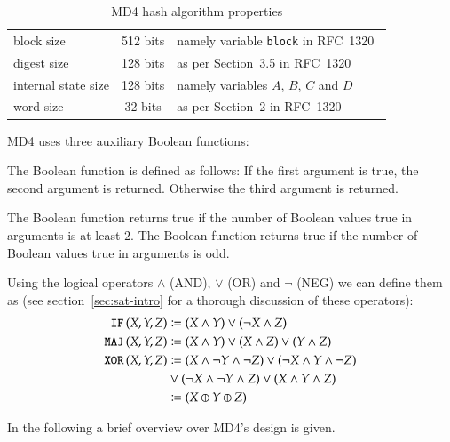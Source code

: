 \begin{table}[h]
  \begin{center}
    \begin{tabular}{lcl}
      block size           & 512 bits       & namely variable \texttt{block} in RFC~1320~\cite{rfc1320} \\
      digest size          & 128 bits       & as per Section~3.5 in RFC~1320~\cite{rfc1320} \\
      internal state size  & 128 bits       & namely variables $A$, $B$, $C$ and $D$ \\
      word size            & 32 bits        & as per Section~2 in RFC~1320~\cite{rfc1320} \\
    \end{tabular}
    \caption{MD4 hash algorithm properties}
    \label{tab:md4}
  \end{center}
\end{table}

MD4 uses three auxiliary Boolean functions:
\begin{defi}
  The Boolean  function is defined as follows:
  If the first argument is true, the second argument is returned.
  Otherwise the third argument is returned.

  The Boolean  function returns true if the number
  of Boolean values true in arguments is at least $2$.
  The Boolean  function returns true if the number
  of Boolean values true in arguments is odd.
\end{defi}

Using the logical operators $\land$ (AND), $\lor$ (OR) and $\neg$ (NEG)
we can define them as (see section~\ref{sec:sat-intro} for a thorough
discussion of these operators):
\begin{align}
  \operatorname{\texttt{IF\,}}(X,Y,Z) &\coloneqq (X \land Y) \lor (\neg X \land Z) \\
  \operatorname{\texttt{MAJ\,}}(X,Y,Z) &\coloneqq (X \land Y) \lor (X \land Z) \lor (Y \land Z) \\
  \operatorname{\texttt{XOR\,}}(X,Y,Z) &\coloneqq (X \land \neg Y \land \neg Z) \lor (\neg X \land Y \land \neg Z) \nonumber\\
              &\lor (\neg X \land \neg Y \land Z) \lor (X \land Y \land Z) \nonumber\\
              &\coloneqq (X \oplus Y \oplus Z)
\end{align}


In the following a brief overview over MD4's design is given.

